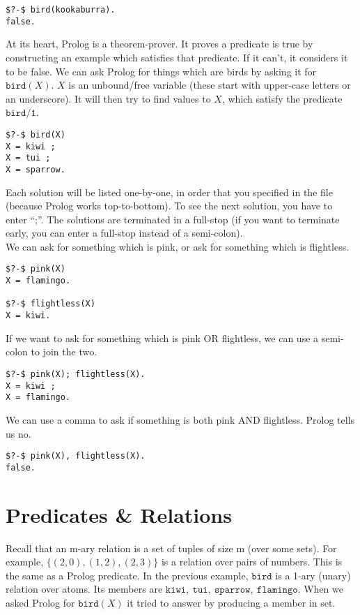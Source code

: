 \documentclass[a4paper,12pt]{article}
\newcommand{\kwa}[1]{\mathtt{#1}}
\begin{document}
\begin{lstlisting}
$?-$ bird(kookaburra).
false.
\end{lstlisting}

\noindent
At its heart, Prolog is a theorem-prover. It proves a predicate is true by constructing an example which satisfies that predicate. If it can't, it considers it to be false. We can ask Prolog for things which are birds by asking it for $\kwa{bird}(X)$. $X$ is an unbound/free variable (these start with upper-case letters or an underscore). It will then try to find values to $X$, which satisfy the predicate $\kwa{bird \slash 1}$.

\begin{lstlisting}
$?-$ bird(X)
X = kiwi ;
X = tui ;
X = sparrow.
\end{lstlisting}

\noindent
Each solution will be listed one-by-one, in order that you specified in the file (because Prolog works top-to-bottom). To see the next solution, you have to enter ``;''. The solutions are terminated in a full-stop (if you want to terminate early, you can enter a full-stop instead of a semi-colon). \\

\noindent
We can ask for something which is pink, or ask for something which is flightless.
\begin{lstlisting}
$?-$ pink(X)
X = flamingo.

$?-$ flightless(X)
X = kiwi.
\end{lstlisting}

\noindent
If we want to ask for something which is pink OR flightless, we can use a semi-colon to join the two.

\begin{lstlisting}
$?-$ pink(X); flightless(X).
X = kiwi ;
X = flamingo.
\end{lstlisting}

\noindent
We can use a comma to ask if something is both pink AND flightless. Prolog tells us no.

\begin{lstlisting}
$?-$ pink(X), flightless(X).
false.
\end{lstlisting}

\section{Predicates \& Relations}

Recall that an m-ary relation is a set of tuples of size m (over some sets). For example, $\{ (2,0), (1,2), (2,3) \}$ is a relation over pairs of numbers. This is the same as a Prolog predicate. In the previous example, $\kwa{bird}$ is a 1-ary (unary) relation over atoms. Its members are $\kwa{ kiwi,~tui,~sparrow,~flamingo }$. When we asked Prolog for $\kwa{bird}(X)$ it tried to answer by producing a member in set. \\
\end{document}
